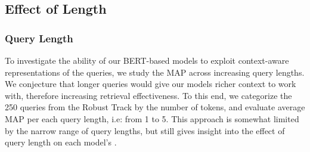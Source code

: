 \subsection{Effect of Length}

\subsubsection{Query Length}

\begin{table*}[b!]
\caption{}
\label{tab:results-query-length}
\end{table*}

To investigate the ability of our BERT-based models to exploit context-aware representations of the queries, we study the MAP across increasing query lengths.
We conjecture that longer queries would give our models richer context to work with, therefore increasing retrieval effectiveness.
To this end, we categorize the 250 queries from the Robust Track by the number of tokens, and evaluate average MAP per each query length, i.e: from 1 to 5.
This approach is somewhat limited by the narrow range of query lengths, but still gives insight into the effect of query length on each model's .

